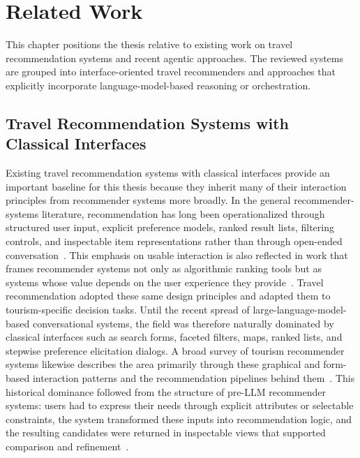 
\chapter{Related Work}\label{chapter:related-work}

This chapter positions the thesis relative to existing work on travel recommendation systems and recent agentic approaches. The reviewed systems are grouped into interface-oriented travel recommenders and approaches that explicitly incorporate language-model-based reasoning or orchestration.

\section{Travel Recommendation Systems with Classical Interfaces}\label{section:related-work:classical-interfaces}
Existing travel recommendation systems with classical interfaces provide an important baseline for this thesis because they inherit many of their interaction principles from recommender systems more broadly. In the general recommender-systems literature, recommendation has long been operationalized through structured user input, explicit preference models, ranked result lists, filtering controls, and inspectable item representations rather than through open-ended conversation~\parencite{adomaviciusTuzhilinNextGeneration}. This emphasis on usable interaction is also reflected in work that frames recommender systems not only as algorithmic ranking tools but as systems whose value depends on the user experience they provide~\parencite{konstanRiedlUserExperience}. Travel recommendation adopted these same design principles and adapted them to tourism-specific decision tasks. Until the recent spread of large-language-model-based conversational systems, the field was therefore naturally dominated by classical interfaces such as search forms, faceted filters, maps, ranked lists, and stepwise preference elicitation dialogs. A broad survey of tourism recommender systems likewise describes the area primarily through these graphical and form-based interaction patterns and the recommendation pipelines behind them~\parencite{borrasIntelligentTourismSurvey}. This historical dominance followed from the structure of pre-LLM recommender systems: users had to express their needs through explicit attributes or selectable constraints, the system transformed these inputs into recommendation logic, and the resulting candidates were returned in inspectable views that supported comparison and refinement~\parencite{luRecommenderSystems}.

